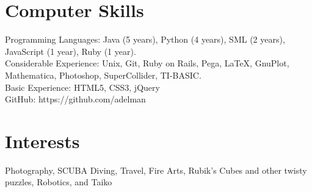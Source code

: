 \documentclass[11pt]{res} %
\begin{document}
\begin{resume}
 
\section{Computer Skills} 
Programming Languages: Java (5 years), Python (4 years), SML (2 years),
JavaScript (1 year), Ruby (1 year).\\
Considerable Experience: Unix, Git, Ruby on Rails, Pega, \LaTeX, GnuPlot, 
Mathematica, Photoshop, SuperCollider, TI-BASIC.\\
Basic Experience: HTML5, CSS3, jQuery\\
GitHub: https://github.com/adelman

\section{Interests} 
Photography, SCUBA Diving, Travel, Fire Arts, Rubik's Cubes and other twisty
puzzles, Robotics, and Taiko 

\end{resume}
\end{document}
